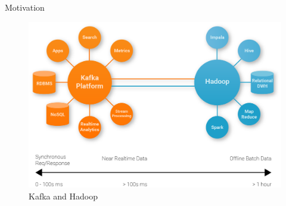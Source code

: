 \begin{frame}{Motivation}
	\begin{figure}
		\centering
		\includegraphics[scale=0.165]{figure/kafka_vs_hadoop.png}
		\caption{Kafka and Hadoop~\cite{Rao17}}
	\end{figure}
\end{frame}


